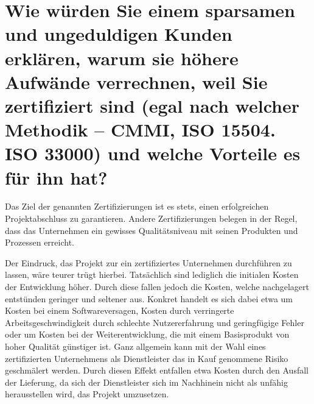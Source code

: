 \section{Wie würden Sie einem sparsamen und ungeduldigen Kunden erklären, warum sie höhere Aufwände verrechnen, weil Sie zertifiziert sind (egal nach welcher Methodik – CMMI, ISO 15504. ISO 33000) und welche Vorteile es für ihn hat?}
Das Ziel der genannten Zertifizierungen ist es stets, einen erfolgreichen Projektabschluss zu garantieren. Andere Zertifizierungen belegen in der Regel, dass das Unternehmen ein gewisses Qualitätsniveau mit seinen Produkten und Prozessen erreicht.

Der Eindruck, das Projekt zur ein zertifiziertes Unternehmen durchführen zu lassen, wäre teurer trügt hierbei. Tatsächlich sind lediglich die initialen Kosten der Entwicklung höher. Durch diese fallen jedoch die Kosten, welche nachgelagert entstünden geringer und seltener aus. Konkret handelt es sich dabei etwa um Kosten bei einem Softwareversagen, Kosten durch verringerte Arbeitsgeschwindigkeit durch schlechte Nutzererfahrung und geringfügige Fehler oder um Kosten bei der Weiterentwicklung, die mit einem Basisprodukt von hoher Qualität günstiger ist. Ganz allgemein kann mit der Wahl eines zertifizierten Unternehmens als Dienstleister das in Kauf genommene Risiko geschmälert werden. Durch diesen Effekt entfallen etwa Kosten durch den Ausfall der Lieferung, da sich der Dienstleister sich im Nachhinein nicht als unfähig herausstellen wird, das Projekt umzusetzen.